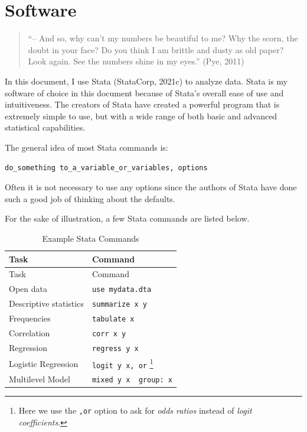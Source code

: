 \documentclass[
  letterpaper,
  DIV=11,
  numbers=noendperiod]{scrreprt}
\begin{document}

\hypertarget{sec-software}{%
\chapter{Software}\label{sec-software}}

\begin{quote}
``-- And so, why can't my numbers be beautiful to me? Why the scorn, the
doubt in your face? Do you think I am brittle and dusty as old paper?
Look again. See the numbers shine in my eyes.'' (Pye, 2011)
\end{quote}

In this document, I use Stata (StataCorp, 2021c) to analyze data. Stata
is my software of choice in this document because of Stata's overall
ease of use and intuitiveness. The creators of Stata have created a
powerful program that is extremely simple to use, but with a wide range
of both basic and advanced statistical capabilities.

The general idea of most Stata commands is:

\texttt{do\_something\ to\_a\_variable\_or\_variables,\ options}

Often it is not necessary to use any options since the authors of Stata
have done such a good job of thinking about the defaults.

For the sake of illustration, a few Stata commands are listed below.

\hypertarget{tbl-Statacommands}{}
\begin{longtable}[]{@{}ll@{}}
\caption{\label{tbl-Statacommands}Example Stata Commands}\tabularnewline
\toprule()
Task & Command \\
\midrule()
\endfirsthead
\toprule()
Task & Command \\
\midrule()
\endhead
Open data & \texttt{use\ mydata.dta} \\
Descriptive statistics & \texttt{summarize\ x\ y} \\
Frequencies & \texttt{tabulate\ x} \\
Correlation & \texttt{corr\ x\ y} \\
Regression & \texttt{regress\ y\ x} \\
Logistic Regression & \texttt{logit\ y\ x,\ or} \footnote{Here we use
  the \texttt{,or} option to ask for \emph{odds ratios} instead of
  \emph{logit coefficients}.} \\
Multilevel Model &
\texttt{mixed\ y\ x\ \textbar{}\textbar{}\ group:\ x} \\
\bottomrule()
\end{longtable}
\end{document}

